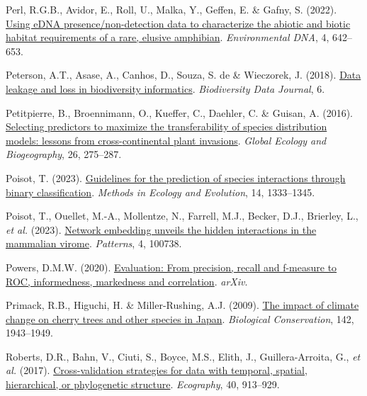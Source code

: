 \documentclass[
  letterpaper,
]{scrbook}
\newlength{\cslhangindent}
\newenvironment{CSLReferences}[2] %
 {\begin{list}{}{%
  \setlength{\itemindent}{0pt}
  \setlength{\leftmargin}{0pt}
  \setlength{\parsep}{0pt}
  \ifodd #1
   \setlength{\leftmargin}{\cslhangindent}
   \setlength{\itemindent}{-1\cslhangindent}
  \fi
  \setlength{\itemsep}{#2\baselineskip}}}
 {\end{list}}
\begin{document}
\begin{CSLReferences}{1}{0}
Perl, R.G.B., Avidor, E., Roll, U., Malka, Y., Geffen, E. \& Gafny, S.
(2022). \href{https://doi.org/10.1002/edn3.276}{Using eDNA
presence/non{-}detection data to characterize the abiotic and biotic
habitat requirements of a rare, elusive amphibian}. \emph{Environmental
DNA}, 4, 642--653.

Peterson, A.T., Asase, A., Canhos, D., Souza, S. de \& Wieczorek, J.
(2018). \href{https://doi.org/10.3897/bdj.6.e26826}{Data leakage and
loss in biodiversity informatics}. \emph{Biodiversity Data Journal}, 6.

Petitpierre, B., Broennimann, O., Kueffer, C., Daehler, C. \& Guisan, A.
(2016). \href{https://doi.org/10.1111/geb.12530}{Selecting predictors to
maximize the transferability of species distribution models: lessons
from cross{-}continental plant invasions}. \emph{Global Ecology and
Biogeography}, 26, 275--287.

Poisot, T. (2023).
\href{https://doi.org/10.1111/2041-210x.14071}{Guidelines for the
prediction of species interactions through binary classification}.
\emph{Methods in Ecology and Evolution}, 14, 1333--1345.

Poisot, T., Ouellet, M.-A., Mollentze, N., Farrell, M.J., Becker, D.J.,
Brierley, L., \emph{et al.} (2023).
\href{https://doi.org/10.1016/j.patter.2023.100738}{Network embedding
unveils the hidden interactions in the mammalian virome}.
\emph{Patterns}, 4, 100738.

Powers, D.M.W. (2020).
\href{https://doi.org/10.48550/ARXIV.2010.16061}{Evaluation: From
precision, recall and f-measure to ROC, informedness, markedness and
correlation}. \emph{arXiv}.

Primack, R.B., Higuchi, H. \& Miller-Rushing, A.J. (2009).
\href{https://doi.org/10.1016/j.biocon.2009.03.016}{The impact of
climate change on cherry trees and other species in Japan}.
\emph{Biological Conservation}, 142, 1943--1949.

Roberts, D.R., Bahn, V., Ciuti, S., Boyce, M.S., Elith, J.,
Guillera-Arroita, G., \emph{et al.} (2017).
\href{https://doi.org/10.1111/ecog.02881}{Cross{-}validation strategies
for data with temporal, spatial, hierarchical, or phylogenetic
structure}. \emph{Ecography}, 40, 913--929.


\end{CSLReferences}
\end{document}
